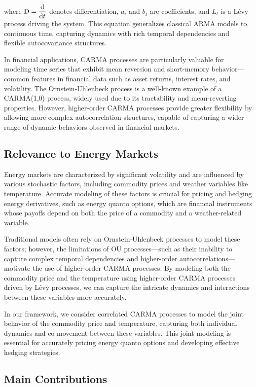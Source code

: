 \documentclass[10pt,a4paper,reqno]{amsart}
\theoremstyle{example}
\newcommand*\D{\mathop{}\!\textnormal{d}}
\begin{document}
where $\mathrm{D} = \dfrac{\D}{\D t}$ denotes differentiation, $a_i$ and $b_j$ are coefficients, and $L_t$ is a Lévy process driving the system. This equation generalizes classical ARMA models to continuous time, capturing dynamics with rich temporal dependencies and flexible autocovariance structures.

In financial applications, CARMA processes are particularly valuable for modeling time series that exhibit mean reversion and short-memory behavior—common features in financial data such as asset returns, interest rates, and volatility. The Ornstein-Uhlenbeck process is a well-known example of a CARMA(1,0) process, widely used due to its tractability and mean-reverting properties. However, higher-order CARMA processes provide greater flexibility by allowing more complex autocorrelation structures, capable of capturing a wider range of dynamic behaviors observed in financial markets.

\subsection{Relevance to Energy Markets}

Energy markets are characterized by significant volatility and are influenced by various stochastic factors, including commodity prices and weather variables like temperature. Accurate modeling of these factors is crucial for pricing and hedging energy derivatives, such as energy quanto options, which are financial instruments whose payoffs depend on both the price of a commodity and a weather-related variable.

Traditional models often rely on Ornstein-Uhlenbeck processes to model these factors; however, the limitations of OU processes—such as their inability to capture complex temporal dependencies and higher-order autocorrelations—motivate the use of higher-order CARMA processes. By modeling both the commodity price and the temperature using higher-order CARMA processes driven by Lévy processes, we can capture the intricate dynamics and interactions between these variables more accurately.

In our framework, we consider correlated CARMA processes to model the joint behavior of the commodity price and temperature, capturing both individual dynamics and co-movement between these variables. This joint modeling is essential for accurately pricing energy quanto options and developing effective hedging strategies.


\subsection{Main Contributions}
\end{document}
